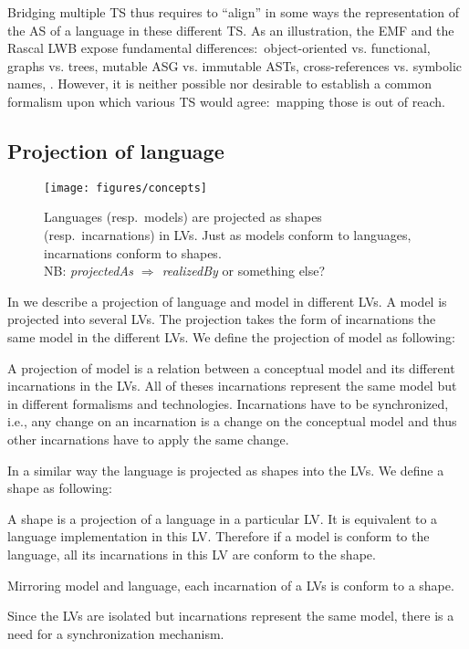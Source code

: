 Bridging multiple TS thus requires to ``align'' in some ways the representation of the AS of a language in these different TS.
As an illustration, the EMF and the Rascal LWB expose fundamental differences:~object-oriented vs. functional, graphs vs. trees, mutable ASG vs. immutable ASTs, cross-references vs. symbolic names, \etc.
However, it is neither possible nor desirable to establish a common formalism upon which various TS would agree:~mapping those is out of reach.

\subsection{Projection of language}

\begin{figure}
	\centering
	\texttt{[image: figures/concepts]}
	\caption{Languages (resp.~models) are projected as shapes (resp.~incarnations) in LVs. Just as models conform to languages, incarnations conform to shapes.\\NB: \emph{projectedAs $\Rightarrow$ realizedBy} or something else?}
	\label{fig:concepts}
\end{figure}

In  we describe a projection of language and model in different LVs.
A model is projected into several LVs.
The projection takes the form of incarnations the same model in the different LVs.
We define the projection of model as following:
\begin{definition}
A projection of model is a relation between a conceptual model and its different incarnations in the LVs.
All of theses incarnations represent the same model but in different formalisms and technologies.
Incarnations have to be synchronized, i.e., any change on an incarnation is a change on the conceptual model and thus other incarnations have to apply the same change.
\end{definition}
In a similar way the language is projected as shapes into the LVs.
We define a shape as following:
\begin{definition}
A shape is a projection of a language in a particular LV.
It is equivalent to a language implementation in this LV.
Therefore if a model is conform to the language, all its incarnations in this LV are conform to the shape.
\end{definition}
Mirroring model and language, each incarnation of a LVs is conform to a shape.

Since the LVs are isolated but incarnations represent the same model, there is a need for a synchronization mechanism.


